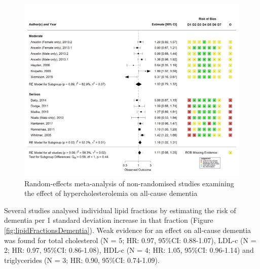 \documentclass[a4paper, twoside]{templates/ociamthesis}
\begin{document}
\begin{figure}[H]
\includegraphics[width=1\linewidth]{figures/sys-rev/fp_obs_hyperchol_Dementia} \caption[Meta-analysis of hypercholesterolemia on all-cause dementia]{Random-effects meta-analysis of non-randomised studies examining the effect of hypercholesterolemia on all-cause dementia}\label{fig:obsHyperDementia}
\end{figure}

Several studies analysed individual lipid fractions by estimating the risk of dementia per 1 standard deviation increase in that fraction (Figure \ref{fig:lipidFractionsDementia}). Weak evidence for an effect on all-cause dementia was found for total cholesterol (N = 5; HR: 0.97, 95\%CI: 0.88-1.07), LDL-c (N = 2; HR: 0.97, 95\%CI: 0.86-1.08), HDL-c (N = 4; HR: 1.05, 95\%CI: 0.96-1.14) and triglycerides (N = 3; HR: 0.90, 95\%CI: 0.74-1.09).
\end{document}
